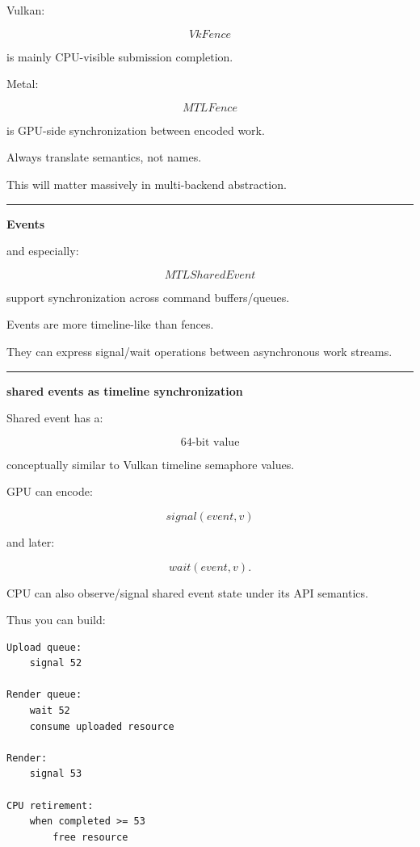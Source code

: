 Vulkan:

\[
VkFence
\]

is mainly CPU-visible submission completion.

Metal:

\[
MTLFence
\]

is GPU-side synchronization between encoded work.

Always translate semantics, not names.

This will matter massively in multi-backend abstraction.

\begin{center}\rule{0.5\linewidth}{0.5pt}\end{center}

\textbf{Events}

 and especially:

\[
MTLSharedEvent
\]

support synchronization across command buffers/queues.

Events are more timeline-like than fences.

They can express signal/wait operations between asynchronous work streams.

\begin{center}\rule{0.5\linewidth}{0.5pt}\end{center}

\textbf{shared events as timeline synchronization}

Shared event has a:

\[
64\text{-bit value}
\]

conceptually similar to Vulkan timeline semaphore values.

GPU can encode:

\[
signal(event,v)
\]

and later:

\[
wait(event,v).
\]

CPU can also observe/signal shared event state under its API semantics.

Thus you can build:

\begin{verbatim}
Upload queue:
    signal 52

Render queue:
    wait 52
    consume uploaded resource

Render:
    signal 53

CPU retirement:
    when completed >= 53
        free resource
\end{verbatim}

